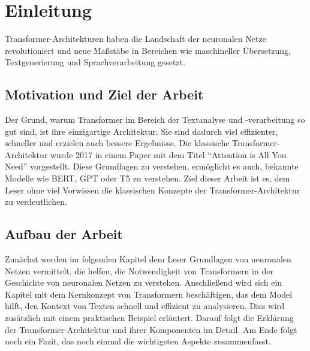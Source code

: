 \chapter{Einleitung}

Transformer-Architekturen haben die Landschaft der neuronalen Netze revolutioniert und neue Maßstäbe in Bereichen wie maschineller Übersetzung, Textgenerierung und Sprachverarbeitung gesetzt.  

\section{Motivation und Ziel der Arbeit}

Der Grund, warum Transformer im Bereich der Textanalyse und -verarbeitung so gut sind, ist ihre einzigartige Architektur.  
Sie sind dadurch viel effizienter, schneller und erzielen auch bessere Ergebnisse.  
Die klassische Transformer-Architektur wurde 2017 in einem Paper mit dem Titel \enquote{Attention is All You Need} vorgestellt.  
Diese Grundlagen zu verstehen, ermöglicht es auch, bekannte Modelle wie BERT, GPT oder T5 zu verstehen.  
Ziel dieser Arbeit ist es, dem Leser ohne viel Vorwissen die klassischen Konzepte der Transformer-Architektur zu verdeutlichen.  

\section{Aufbau der Arbeit}

Zunächst werden im folgenden Kapitel dem Leser Grundlagen von neuronalen Netzen vermittelt, die helfen, die Notwendigkeit von Transformern in der Geschichte von neuronalen Netzen zu verstehen.  
Anschließend wird sich ein Kapitel mit dem Kernkonzept von Transformern beschäftigen, das dem Model hilft, den Kontext von Texten schnell und effizient zu analysieren.  
Dies wird zusätzlich mit einem praktischen Beispiel erläutert.  
Darauf folgt die Erklärung der Transformer-Architektur und ihrer Komponenten im Detail.  
Am Ende folgt noch ein Fazit, das noch einmal die wichtigsten Aspekte zusammenfasst.  
